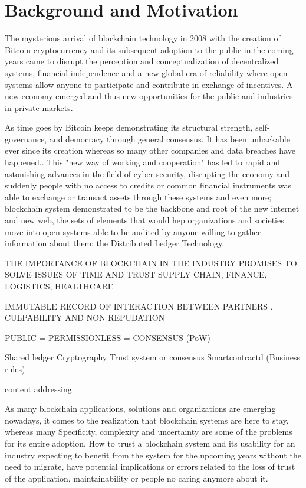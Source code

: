 \section{Background and Motivation}
\label{sec:motivation}
The mysterious arrival of blockchain technology in 2008 with the creation of Bitcoin cryptocurrency and its subsequent adoption to the public in the coming years came to disrupt the perception and conceptualization of decentralized systems, financial independence and a new global era of reliability where open systems allow anyone to participate and contribute in exchange of incentives. A new economy emerged and thus new opportunities for the public and industries in private markets.

As time goes by Bitcoin keeps demonstrating its structural strength, self-governance, and democracy through general consensus. It has been unhackable ever since its creation whereas so many other companies and data breaches have happened.\cite{wikipedia_2022}. This "new way of working and cooperation" has led to rapid and astonishing advances in the field of cyber security, disrupting the economy and suddenly people with no access to credits or common financial instruments was able to exchange or transact assets through these systems and even more; blockchain system demonstrated to be the backbone and root of the new internet and new web, the sets of elements that would hep organizations and societies move into open systems able to be audited by anyone willing to gather information about them: the Distributed Ledger Technology.



THE IMPORTANCE OF BLOCKCHAIN IN THE INDUSTRY
PROMISES TO SOLVE ISSUES OF TIME AND TRUST SUPPLY CHAIN, FINANCE, LOGISTICS, HEALTHCARE

IMMUTABLE RECORD OF INTERACTION BETWEEN PARTNERS . CULPABILITY AND NON REPUDATION

PUBLIC = PERMISSIONLESS = CONSENSUS (PoW)


Shared ledger
Cryptography
Trust system or consensus
Smartcontractd (Business rules)

content addressing  

As many blockchain applications, solutions  and organizations are emerging nowadays, it comes to the realization that blockchain systems are here to stay, whereas many Specificity, complexity and uncertainty are some of the problems for its entire adoption. How to trust a blockchain system and its usability for an industry expecting to benefit from the system for the upcoming years without the need to migrate, have potential implications or errors related to the loss of trust of the application, maintainability or people no caring anymore about it.

